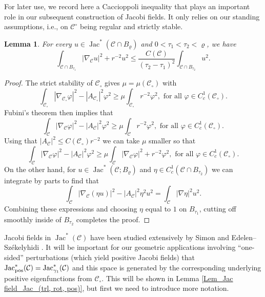 \documentclass[11pt, letterpaper, reqno]{amsart}
\numberwithin{equation}{section}
\newtheorem{Lem}[Def]{Lemma}
\theoremstyle{remark}
\newcommand{\cC}{\mathcal{C}}
\newcommand{\Jac}{\operatorname{Jac}}
\begin{document}
For later use, we record here a Caccioppoli inequality that plays an important role in our subsequent construction of Jacobi fields. It only relies on our standing assumptions, i.e., on $\cC^\circ$ being regular and strictly stable.

    \begin{Lem} \label{Lem_Jac field_Caccioppoli-type Ineq}
       For every $u \in \Jac^*(\cC \cap B_\varrho)$ and $0 < {\tau_1} < {\tau_2} < \varrho$, we have
        \[ \int_{\cC \cap B_{\tau_1}} |\nabla_{\cC} u|^2 + r^{-2} u^2 \leq \frac{C(\cC)}{({\tau_2}-{\tau_1})^2} \int_{\cC \cap B_{\tau_2}} u^2. \]
    \end{Lem}
    \begin{proof}
      The strict stability of $\cC_\circ$ gives $\mu=\mu(\cC_\circ)$ with
      \[
        \int_{\cC_\circ} |\nabla_{\cC_\circ} \varphi|^2 - |A_{\cC_\circ}|^2\varphi^2 \geq \mu \int_{\cC_\circ} r^{-2}\varphi^2, \text{ for all } \varphi\in C^1_c(\cC_\circ).
      \] 
      Fubini's theorem then implies that
      \[
       \int_{\cC} |\nabla_{\cC} \varphi|^2 - |A_{\cC}|^2\varphi^2 \geq \mu \int_{\cC} r^{-2}\varphi^2, \text{ for all } \varphi\in C^1_c(\cC_\circ).
      \]
       Using that $|A_{\cC}|^2 \leq C(\cC_\circ)r^{-2}$ we can take $\mu$ smaller so that 
        \[
       \int_{\cC} |\nabla_{\cC} \varphi|^2 - |A_{\cC}|^2\varphi^2 \geq \mu \int_{\cC} |\nabla_{\cC}\varphi|^2 + r^{-2}\varphi^2, \text{ for all } \varphi\in C^1_c(\cC_\circ).
      \]
      On the other hand, for $u\in \Jac^*(\cC; B_\varrho)$ and $\eta \in C^1_c(\cC \cap B_{\tau_2})$ we can integrate by parts to find that 
      \[
       \int_{\cC} |\nabla_{\cC} (\eta u)|^2 - |A_{\cC}|^2\eta^2u^2 = \int_{\cC} |\nabla \eta|^2 u^2. 
      \]
      Combining these expressions and choosing $\eta$ equal to $1$ on $B_{\tau_1}$, cutting off smoothly inside of $B_{\tau_2}$ completes the proof.
          \end{proof}

Jacobi fields in $\Jac^*(\cC)$ have been studied extensively by Simon \cite{Simon:uniqueness.some, Simon:liouville} and Edelen--Sz\'ekelyhidi \cite[Section 2.5]{EdelenSzekelyhidi:liouville}. It will be important for our geometric applications involving ``one-sided'' perturbations (which yield positive Jacobi fields) that $\Jac^*_\textnormal{pos}(\cC) = \Jac^*_{\gamma_1}(\cC)$ and this space is generated by the corresponding underlying positive eigenfunctions from $\cC_\circ$. This will be shown in Lemma \ref{Lem_Jac field_Jac_(trl, rot, pos)}, but first we need to introduce more notation.
\end{document}
